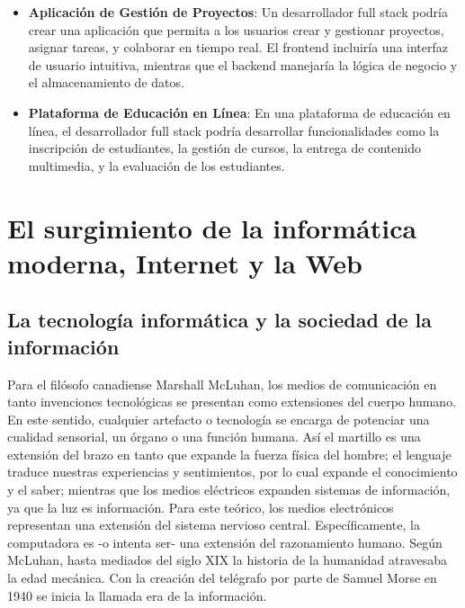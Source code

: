 \documentclass[
  letterpaper,
  DIV=11,
  numbers=noendperiod]{scrreprt}
\begin{document}
\begin{itemize}
\item
  \textbf{Aplicación de Gestión de Proyectos}: Un desarrollador full
  stack podría crear una aplicación que permita a los usuarios crear y
  gestionar proyectos, asignar tareas, y colaborar en tiempo real. El
  frontend incluiría una interfaz de usuario intuitiva, mientras que el
  backend manejaría la lógica de negocio y el almacenamiento de datos.
\item
  \textbf{Plataforma de Educación en Línea}: En una plataforma de
  educación en línea, el desarrollador full stack podría desarrollar
  funcionalidades como la inscripción de estudiantes, la gestión de
  cursos, la entrega de contenido multimedia, y la evaluación de los
  estudiantes.
\end{itemize}


\chapter{\texorpdfstring{\textbf{El surgimiento de la informática
moderna, Internet y la
Web}}{El surgimiento de la informática moderna, Internet y la Web}}\label{el-surgimiento-de-la-informuxe1tica-moderna-internet-y-la-web}

\section{\texorpdfstring{\textbf{La tecnología informática y la sociedad
de la
información}}{La tecnología informática y la sociedad de la información}}\label{la-tecnologuxeda-informuxe1tica-y-la-sociedad-de-la-informaciuxf3n}

Para el filósofo canadiense Marshall McLuhan, los medios de comunicación
en tanto invenciones tecnológicas se presentan como extensiones del
cuerpo humano. En este sentido, cualquier artefacto o tecnología se
encarga de potenciar una cualidad sensorial, un órgano o una función
humana. Así el martillo es una extensión del brazo en tanto que expande
la fuerza física del hombre; el lenguaje traduce nuestras experiencias y
sentimientos, por lo cual expande el conocimiento y el saber; mientras
que los medios eléctricos expanden sistemas de información, ya que la
luz es información. Para este teórico, los medios electrónicos
representan una extensión del sistema nervioso central. Específicamente,
la computadora es -o intenta ser- una extensión del razonamiento humano.
Según McLuhan, hasta mediados del siglo XIX la historia de la humanidad
atravesaba la edad mecánica. Con la creación del telégrafo por parte de
Samuel Morse en 1940 se inicia la llamada era de la información.
\end{document}
